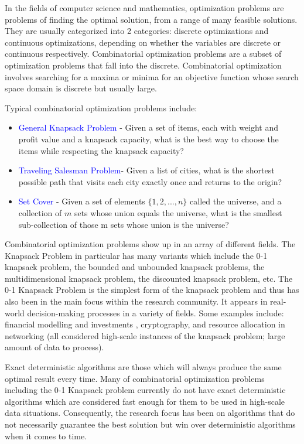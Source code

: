 \documentclass[titlepage]{article}
\begin{document}
In the fields of computer science and mathematics, optimization problems are problems of finding the optimal solution, from a range of many feasible solutions. They are usually categorized into 2 categories: discrete optimizations and continuous optimizations, depending on whether the variables are discrete or continuous respectively. Combinatorial optimization problems are a subset of optimization problems that fall into the discrete. Combinatorial optimization involves searching for a maxima or minima for an objective function whose search space domain is discrete but usually large.

Typical combinatorial optimization problems include:
\begin{itemize}
    \item \textcolor{blue}{General Knapsack Problem} - Given a set of items, each with weight and profit value and a knapsack capacity, what is the best way to choose the items while respecting the knapsack capacity?
    \item \textcolor{blue}{Traveling Salesman Problem}- Given a list of cities, what is the shortest possible path that visits each city exactly once and returns to the origin?
    \item \textcolor{blue}{Set Cover} - Given a set of elements $\{1, 2, ..., n\}$ called the universe, and a collection of $m$ sets whose union equals the universe, what is the smallest sub-collection of those m sets whose union is the universe?
\end{itemize}

Combinatorial optimization problems show up in an array of different fields. The Knapsack Problem in particular has many variants which include the 0-1 knapsack problem, the bounded and unbounded knapsack problems, the multidimensional knapsack problem, the discounted knapsack problem, etc. The 0-1 Knapsack Problem is the simplest form of the knapsack problem and thus has also been in the main focus within the research community. It appears in real-world decision-making processes in a variety of fields. Some examples include: financial modelling and investments \cite{finance}, cryptography, and resource allocation in networking \cite{resource} (all considered high-scale instances of the knapsack problem; large amount of data to process).

Exact deterministic algorithms are those which will always produce the same optimal result every time. Many of combinatorial optimization problems including the 0-1 Knapsack problem currently do not have exact deterministic algorithms which are considered fast enough for them to be used in high-scale data situations. Consequently, the research focus has been on algorithms that do not necessarily guarantee the best solution but win over deterministic algorithms when it comes to time. 
\end{document}
